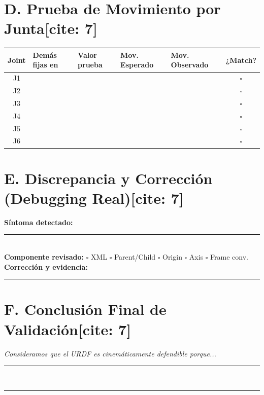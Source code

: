 \documentclass[11pt, a4paper]{article}
\begin{document}
\section*{D. Prueba de Movimiento por Junta[cite: 7]}
\begin{center}
    \footnotesize
    \noindent\begin{tabularx}{\textwidth}{|c|X|X|X|X|c|}
    \hline
    \textbf{Joint} & \textbf{Demás fijas en} & \textbf{Valor prueba} & \textbf{Mov. Esperado} & \textbf{Mov. Observado} & \textbf{¿Match?} \\ \hline
    J1 & & & & & $\square$ \\ \hline
    J2 & & & & & $\square$ \\ \hline
    J3 & & & & & $\square$ \\ \hline
    J4 & & & & & $\square$ \\ \hline
    J5 & & & & & $\square$ \\ \hline
    J6 & & & & & $\square$ \\ \hline
    \end{tabularx}
\end{center}

\section*{E. Discrepancia y Corrección (Debugging Real)[cite: 7]}
\textbf{Síntoma detectado:} \rule{12cm}{0.15mm} \\
\textbf{Componente revisado:} $\square$ XML $\square$ Parent/Child $\square$ Origin $\square$ Axis $\square$ Frame conv. \\
\textbf{Corrección y evidencia:} \rule{12cm}{0.15mm} 

\section*{F. Conclusión Final de Validación[cite: 7]}
\textit{Consideramos que el URDF es cinemáticamente defendible porque...} \rule{6cm}{0.15mm} \\
\rule{\textwidth}{0.15mm}
\end{document}
